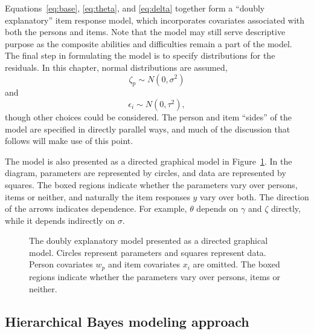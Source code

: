 \documentclass[12pt, letterpaper]{article}
\begin{document}
Equations~\ref{eq:base}, \ref{eq:theta}, and \ref{eq:delta} together form a ``doubly explanatory'' item response model, which incorporates covariates associated with both the persons and items. Note that the model may still serve descriptive purpose as the composite abilities and difficulties remain a part of the model. The final step in formulating the model is to specify distributions for the residuals. In this chapter, normal distributions are assumed,
\begin{equation}
	\zeta_p \sim N(0, \sigma^2)
\end{equation}
and
\begin{equation}
	\epsilon_i \sim N(0, \tau^2)
,\end{equation}
though other choices could be considered. The person and item ``sides'' of the model are specified in directly parallel ways, and much of the discussion that follows will make use of this point.

The model is also presented as a directed graphical model \parencite[for example,][]{dawid1999probabilistic, jordan2004graphical} in Figure~\ref{fig:eirm-model}. In the diagram, parameters are represented by circles, and data are represented by squares. The boxed regions indicate whether the parameters vary over persons, items or neither, and naturally the item responses $y$ vary over both. The direction of the arrows indicates dependence. For example, $\theta$ depends on $\gamma$ and $\zeta$ directly, while it depends indirectly on $\sigma$.

\begin{figure}[btp]
	\centering
	
	\caption[The doubly explanatory model]
	{The doubly explanatory model presented as a directed graphical model. Circles represent parameters and squares represent data. Person covariates $w_p$ and item covariates $x_i$ are omitted. The boxed regions indicate whether the parameters vary over persons, items or neither.}
	\label{fig:eirm-model}
\end{figure}


\subsection{Hierarchical Bayes modeling approach}
\end{document}
